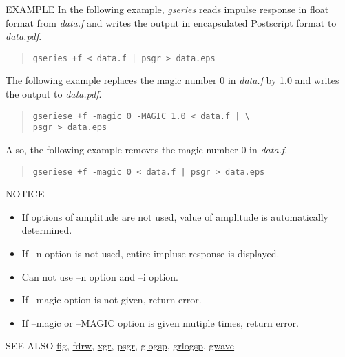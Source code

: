 \begin{qsection}{EXAMPLE}
 In the following example, {\em gseries} reads impulse response
 in float format from {\em data.f} and writes the output
 in encapsulated Postscript format to {\em data.pdf}.
 \begin{quote}
 \verb!gseries +f < data.f | psgr > data.eps!
 \end{quote}
The following example replaces the magic number 0 in {\em data.f} by 1.0 and
writes the output to {\em data.pdf}.
\begin{quote}
  \verb!gseriese +f -magic 0 -MAGIC 1.0 < data.f | \!\\
  \verb!psgr > data.eps!
\end{quote}
Also, the following example removes the magic number 0 in {\em data.f}.
\begin{quote}
  \verb!gseriese +f -magic 0 < data.f | psgr > data.eps!
\end{quote}
\end{qsection}

\begin{qsection}{NOTICE}
\begin{itemize}
\item If options of amplitude are not used, value of amplitude is
automatically determined.
\item If --n option is not used, entire impluse response is displayed.
\item Can not use --n option and --i option. 
\item If --magic option is not given, return error. 
\item If --magic or --MAGIC option is given mutiple times, return
error.
\end{itemize}
\end{qsection}

\begin{qsection}{SEE ALSO}
\hyperlink{fig}{fig},
\hyperlink{fdrw}{fdrw},
\hyperlink{xgr}{xgr},
\hyperlink{psgr}{psgr},
\hyperlink{glogsp}{glogsp},
\hyperlink{grlogsp}{grlogsp},
\hyperlink{gwave}{gwave}
\end{qsection}
